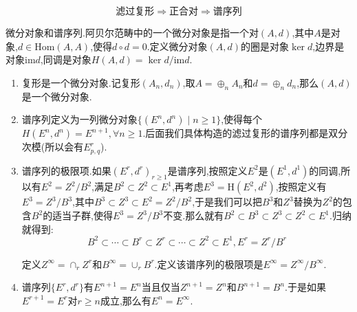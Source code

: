 $$\textbf{滤过复形}\Rightarrow\textbf{正合对}\Rightarrow\textbf{谱序列}$$

微分对象和谱序列.阿贝尔范畴中的一个微分对象是指一个对$(A,d)$,其中$A$是对象,$d\in\mathrm{Hom}(A,A)$,使得$d\circ d=0$.定义微分对象$(A,d)$的圈是对象$\ker d$,边界是对象$\mathrm{im}d$,同调是对象$H(A,d)=\ker d/\mathrm{im}d$.
\begin{enumerate}
	\item 复形是一个微分对象.记复形$(A_n,d_n)$,取$A=\oplus_nA_n$和$d=\oplus_nd_n$,那么$(A,d)$是一个微分对象.
	\item 谱序列定义为一列微分对象$\{(E^n,d^n)\mid n\ge1\}$,使得每个$H(E^n,d^n)=E^{n+1},\forall n\ge1$.后面我们具体构造的滤过复形的谱序列都是双分次模(所以会有$E^r_{p,q}$).
	\item 谱序列的极限项.如果$(E^r,d^r)_{r\ge1}$是谱序列,按照定义$E^2$是$(E^1,d^1)$的同调,所以有$E^2=Z^2/B^2$,满足$B^2\subset Z^2\subset E^1$,再考虑$E^3=\mathrm{H}(E^2,d^2)$,按照定义有$E^3=Z^3/B^3$,其中$B^3\subset Z^3\subset E^2=Z^2/B^2$,于是我们可以把$B^3$和$Z^3$替换为$Z^2$的包含$B^2$的适当子群,使得$E^3=Z^3/B^3$不变.那么就有$B^2\subset B^3\subset Z^3\subset Z^2\subset E^1$.归纳就得到:$$B^2\subset\cdots\subset B^r\subset Z^r\subset\cdots\subset Z^2\subset E^1,E^r=Z^r/B^r$$
	
	定义$Z^{\infty}=\cap_rZ^r$和$B^{\infty}=\cup_rB^r$.定义该谱序列的极限项是$E^{\infty}=Z^{\infty}/B^{\infty}$.
	\item 谱序列$\{E^r,d^r\}$有$E^{n+1}=E^n$当且仅当$Z^{n+1}=Z^n$和$B^{n+1}=B^n$.于是如果$E^{r+1}=E^r$对$r\ge n$成立,那么有$E^n=E^{\infty}$.
\end{enumerate}

